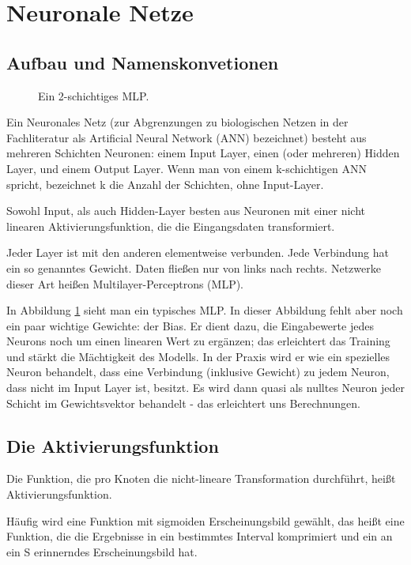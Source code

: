 \section{Neuronale Netze} %

\subsection{Aufbau und Namenskonvetionen}
\begin{figure}[ht!]
\label{fig:MLP}
  \centering
    
  \caption{Ein 2-schichtiges MLP.}
\end{figure}


Ein Neuronales Netz (zur Abgrenzungen zu biologischen Netzen in der Fachliteratur als Artificial Neural Network (ANN) bezeichnet) besteht aus mehreren Schichten Neuronen: einem Input Layer, einen (oder mehreren) Hidden Layer, und einem Output Layer. 
Wenn man von einem k-schichtigen ANN spricht, bezeichnet k die Anzahl der Schichten, ohne Input-Layer.

Sowohl Input, als auch Hidden-Layer besten aus Neuronen mit einer nicht linearen Aktivierungsfunktion, die die Eingangsdaten transformiert.

Jeder Layer ist mit den anderen elementweise verbunden. Jede Verbindung hat ein so genanntes Gewicht. Daten fließen nur von links nach rechts. Netzwerke dieser Art heißen Multilayer-Perceptrons (MLP). 

In Abbildung \ref{fig:MLP} sieht man ein typisches MLP. In dieser Abbildung fehlt aber noch ein paar wichtige Gewichte: der Bias. Er dient dazu, die Eingabewerte jedes Neurons noch um einen linearen Wert zu ergänzen; das erleichtert das Training und stärkt die Mächtigkeit des Modells. In der Praxis wird er wie ein spezielles Neuron behandelt, dass eine Verbindung (inklusive Gewicht) zu jedem Neuron, dass nicht im Input Layer ist, besitzt. Es wird dann quasi als nulltes Neuron jeder Schicht im Gewichtsvektor behandelt - das erleichtert uns Berechnungen.
 

\subsection{Die Aktivierungsfunktion}

Die Funktion, die pro Knoten die nicht-lineare Transformation durchführt, heißt Aktivierungsfunktion. 

Häufig wird eine Funktion mit sigmoiden Erscheinungsbild gewählt, das heißt eine Funktion, die die Ergebnisse in ein bestimmtes Interval komprimiert und ein an ein S erinnerndes Erscheinungsbild hat. 

